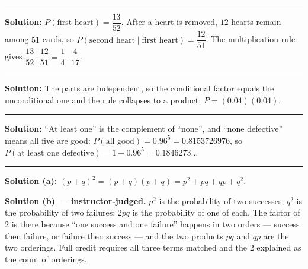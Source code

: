 \documentclass[12pt]{article}
\begin{document}
\vspace{0.15cm}\noindent\rule{\linewidth}{0.2pt}\vspace{0.15cm}


\textbf{Solution:} \quad $P(\text{first heart}) = \dfrac{13}{52}$. After a heart is removed,
$12$ hearts remain among $51$ cards, so $P(\text{second heart} \mid \text{first heart}) =
\dfrac{12}{51}$. The multiplication rule gives
$\dfrac{13}{52} \cdot \dfrac{12}{51} = \dfrac{1}{4} \cdot \dfrac{4}{17}$. 

\vspace{0.15cm}\noindent\rule{\linewidth}{0.2pt}\vspace{0.15cm}


\textbf{Solution:} \quad The parts are independent, so the conditional factor equals the
unconditional one and the rule collapses to a product:
$P = (0.04)(0.04)$. 

\vspace{0.15cm}\noindent\rule{\linewidth}{0.2pt}\vspace{0.15cm}


\textbf{Solution:} \quad ``At least one'' is the complement of ``none'', and ``none defective''
means all five are good:
$P(\text{all good}) = 0.96^5 = 0.8153726976$, so
$P(\text{at least one defective}) = 1 - 0.96^5 = 0.1846273\ldots$ 

\vspace{0.15cm}\noindent\rule{\linewidth}{0.2pt}\vspace{0.15cm}


\textbf{Solution (a):} \quad $(p+q)^2 = (p+q)(p+q) = p^2 + pq + qp + q^2$. 

\textbf{Solution (b) --- instructor-judged.} \quad $p^2$ is the probability of two successes;
$q^2$ is the probability of two failures; $2pq$ is the probability of one of each. The factor
of $2$ is there because ``one success and one failure'' happens in two orders --- success then
failure, or failure then success --- and the two products $pq$ and $qp$ are the two orderings.
Full credit requires all three terms matched and the $2$ explained as the count of orderings.
\end{document}
